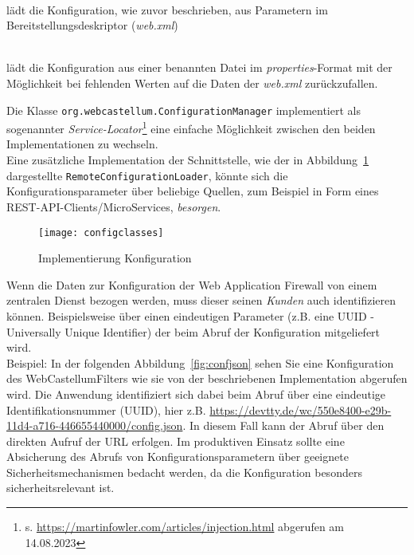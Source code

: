 \begin{description}
  \small
\item[DefaultConfigurationLoader] \hfill \\
  lädt die Konfiguration, wie zuvor beschrieben, aus Parametern im Bereitstellungsdeskriptor (\emph{web.xml})
\item[PropertiesFileConfigurationLoader] \hfill \\
  lädt die Konfiguration aus einer benannten Datei im \emph{properties}-Format mit der Möglichkeit bei fehlenden Werten auf die Daten der \emph{web.xml} zurückzufallen.
\end{description}

Die Klasse \verb=org.webcastellum.ConfigurationManager= implementiert als sogenannter \emph{Service-Locator}\footnote{s. \url{https://martinfowler.com/articles/injection.html} abgerufen am 14.08.2023} eine einfache Möglichkeit zwischen den beiden Implementationen zu wechseln.\\
Eine zusätzliche Implementation der Schnittstelle, wie der in Abbildung~\ref{fig.impkonfig} dargestellte \verb=RemoteConfigurationLoader=, könnte sich die Konfigurationsparameter über beliebige Quellen, zum Beispiel in Form eines REST-API-Clients/MicroServices, \glqq\emph{besorgen}\grqq. 

\begin{figure}[h]
  \begin{center}
    \texttt{[image: configclasses]}
    \caption{Implementierung Konfiguration}
    \label{fig.impkonfig}
  \end{center}
\end{figure}

Wenn die Daten zur Konfiguration der Web Application Firewall von einem zentralen Dienst bezogen werden, muss dieser seinen \emph{Kunden} auch identifizieren können. Beispielsweise über einen eindeutigen Parameter (z.B. eine UUID - Universally Unique Identifier) der beim Abruf der Konfiguration mitgeliefert wird. \\

\textcolor{bhtGray}{ Beispiel:} In der folgenden Abbildung~\ref{fig:confjson} sehen Sie eine Konfiguration des WebCastellumFilters wie sie von der beschriebenen Implementation abgerufen wird. Die Anwendung identifiziert sich dabei beim Abruf über eine eindeutige Identifikationsnummer (UUID), hier z.B. \url{https://devtty.de/wc/550e8400-e29b-11d4-a716-446655440000/config.json}. In diesem Fall kann der Abruf über den direkten Aufruf der URL erfolgen. Im produktiven Einsatz sollte eine Absicherung des Abrufs von Konfigurationsparametern über geeignete Sicherheitsmechanismen bedacht werden, da die Konfiguration besonders sicherheitsrelevant ist.\\

